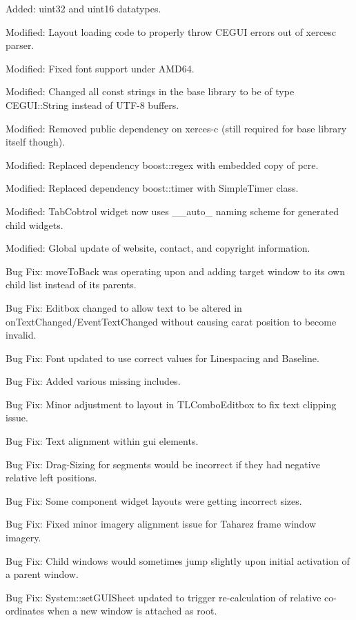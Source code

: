 \begin{DoxyItemize}
\item Added\+: uint32 and uint16 datatypes.
\item Modified\+: Layout loading code to properly throw C\+E\+G\+UI errors out of xercesc parser.
\item Modified\+: Fixed font support under A\+M\+D64.
\item Modified\+: Changed all const strings in the base library to be of type C\+E\+G\+U\+I\+::\+String instead of U\+T\+F-\/8 buffers.
\item Modified\+: Removed public dependency on xerces-\/c (still required for base library itself though).
\item Modified\+: Replaced dependency boost\+::regex with embedded copy of pcre.
\item Modified\+: Replaced dependency boost\+::timer with Simple\+Timer class.
\item Modified\+: Tab\+Cobtrol widget now uses \textquotesingle{}\+\_\+\+\_\+auto\+\_\+\textquotesingle{} naming scheme for generated child widgets.
\item Modified\+: Global update of website, contact, and copyright information.
\item Bug Fix\+: move\+To\+Back was operating upon and adding target window to its own child list instead of its parents.
\item Bug Fix\+: Editbox changed to allow text to be altered in on\+Text\+Changed/\+Event\+Text\+Changed without causing carat position to become invalid.
\item Bug Fix\+: Font updated to use correct values for Linespacing and Baseline.
\item Bug Fix\+: Added various missing includes.
\item Bug Fix\+: Minor adjustment to layout in T\+L\+Combo\+Editbox to fix text clipping issue.
\item Bug Fix\+: Text alignment within gui elements.
\item Bug Fix\+: Drag-\/\+Sizing for segments would be incorrect if they had negative relative \textquotesingle{}left\textquotesingle{} positions.
\item Bug Fix\+: Some component widget layouts were getting incorrect sizes.
\item Bug Fix\+: Fixed minor imagery alignment issue for Taharez frame window imagery.
\item Bug Fix\+: Child windows would sometimes \textquotesingle{}jump\textquotesingle{} slightly upon initial activation of a parent window.
\item Bug Fix\+: System\+::set\+G\+U\+I\+Sheet updated to trigger re-\/calculation of relative co-\/ordinates when a new window is attached as root.

\end{DoxyItemize}
